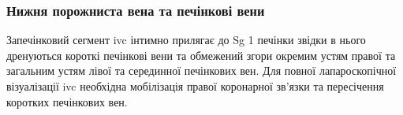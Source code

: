 \begin{refsection}
\subsubsection{Нижня порожниста вена та печінкові вени}

Запечінковий сегмент \acrshort{ivc} інтимно прилягає до Sg 1 печінки звідки в нього дренуються короткі печінкові вени та обмежений згори окремим устям правої та загальним устям лівої та серединної печінкових вен. Для повної лапароскопічної візуалізації \acrshort{ivc} необхідна мобілізація правої коронарної зв'язки та пересічення коротких печінкових вен. 

\printbibliography[heading=subbibliography] 

\end{refsection}